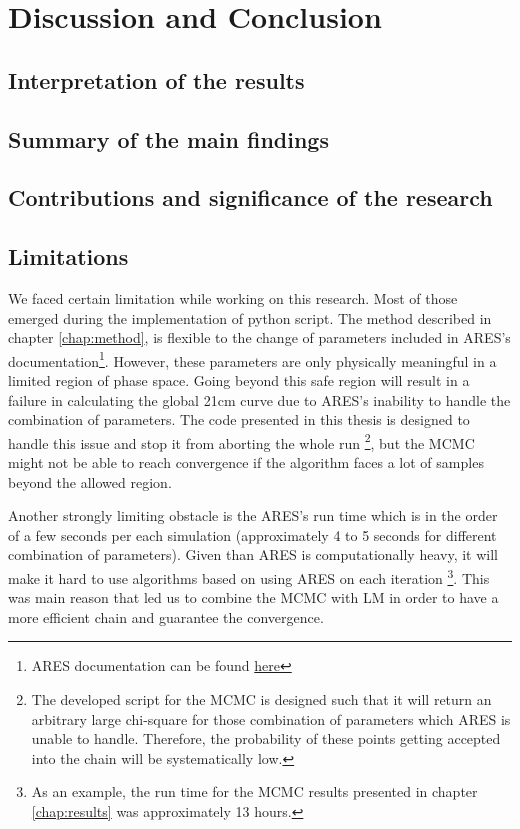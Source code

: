 \documentclass[12pt, TexShade, letterpaper]{report}
\begin{document}
\chapter{Discussion and Conclusion}
\label{chap:discussion}
\section{Interpretation of the results}
\section{Summary of the main findings}
\section{Contributions and significance of the research}
\section{Limitations}
We faced certain limitation while working on this research. Most of those emerged during the implementation of python script. 
The method described in chapter \ref{chap:method}, is flexible to the change of parameters included in ARES's documentation\footnote{ARES documentation can be found \hyperlink{https://ares.readthedocs.io/en/latest/}{here}}. However, these parameters are only physically meaningful in a limited region of phase space. Going beyond this safe region will result in a failure in calculating the global 21cm curve due to ARES's inability to handle the combination of parameters. The code presented in this thesis is designed to handle this issue and stop it from aborting the whole run \footnote{The developed script for the MCMC is designed such that it will return an arbitrary large chi-square for those combination of parameters which ARES is unable to handle. Therefore, the probability of these points getting accepted into the chain will be systematically low.}, but the MCMC might not be able to reach convergence if the algorithm faces a lot of samples beyond the allowed region.\par
Another strongly limiting obstacle is the ARES's run time which is in the order of a few seconds per each simulation (approximately 4 to 5 seconds for different combination of parameters). Given than ARES is computationally heavy, it will make it hard to use algorithms based on using ARES on each iteration \footnote{ As an example, the run time for the MCMC results presented in chapter \ref{chap:results} was approximately 13 hours.}. This was main reason that led us to combine the MCMC with LM in order to have a more efficient chain and guarantee the convergence.\par 
\end{document}
